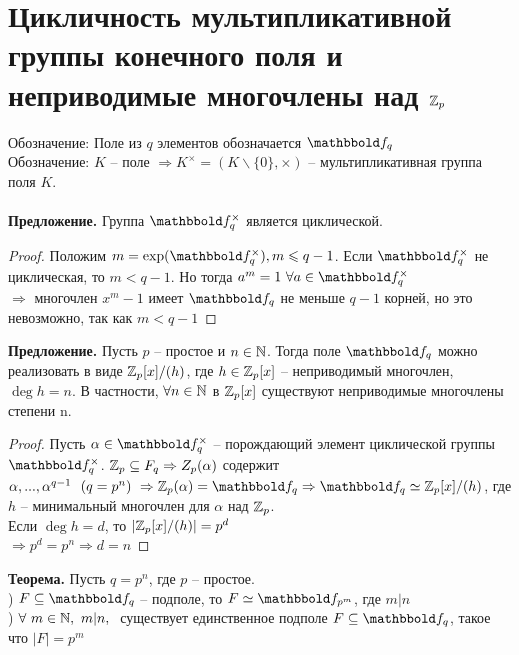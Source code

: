 \section{Цикличность мультипликативной группы конечного поля и неприводимые многочлены над $\mathbb{Z}_p$}

Обозначение: Поле из $q$ элементов обозначается $\F_q$\\
Обозначение: $K$ -- поле $\Rightarrow K^{\times}=\left( K\backslash\{0\}, \times \right) $ -- мультипликативная группа поля $K$.\\\\
\textbf{Предложение.} Группа $\F_q^{\times}$ является циклической.\\
\begin{proof}
    Положим $m=\exp(\F_q^{\times}), m\leqslant q-1$. Если $\F_q^{\times}$ не циклическая, то $m<q-1$. Но тогда $a^m=1\ \forall a\in \F_q^{\times}$\\
    $\Rightarrow $ многочлен $x^m-1$ имеет $\F_q$ не меньше $q-1$ корней, но это невозможно, так как $m<q-1$
\end{proof}
\noindent \textbf{Предложение.} Пусть $p$ -- простое и $n\in \mathbb{N}$. Тогда поле $\F_q$ можно реализовать в виде $\mathbb{Z}_p[x]/(h)$, где $h\in \mathbb{Z}_p[x]$ -- неприводимый многочлен, $\deg{h}=n$. В частности, $\forall n\in \mathbb{N}$ в $\mathbb{Z}_p[x]$ существуют неприводимые многочлены степени n.
\begin{proof}
    Пусть $\alpha \in \F_q^{\times}$ -- порождающий элемент циклической группы $\F_q^{\times}$. $\mathbb{Z}_p\subseteq F_q\Rightarrow Z_p(\alpha) $ содержит $\alpha,...,\alpha^{q-1}  \ \ (q=p^n) \ \Rightarrow\Z_p(\alpha)=\F_q\Rightarrow \F_q\simeq \Z_p[x]/(h)$, где $h$ -- минимальный многочлен для $\alpha$ над $\mathbb{Z}_p$.\\
    Если $\deg{h}=d$, то $\left| \mathbb{Z}_p[x]/(h) \right|=p^d$\\
    $\Rightarrow p^d=p^n\Rightarrow d=n$
\end{proof}
\noindent \textbf{Теорема.} Пусть $q=p^n$, где $p$ -- простое.\\
) $F\subseteq \F_q$ -- подполе, то $F\simeq \F_{p^m}$, где $m|n$\\
) $\forall \ m\in\mathbb{N}, \ m|n,\ $ существует единственное подполе $F\subseteq \F_q$, такое что $|F|=p^m$